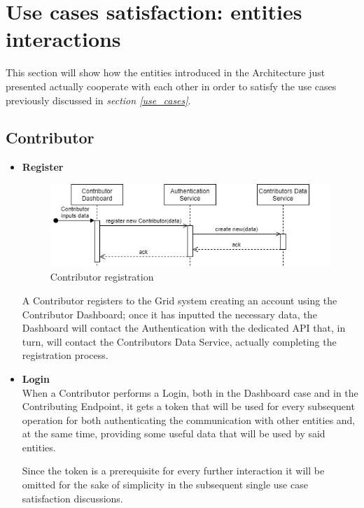 \section{Use cases satisfaction: entities interactions}\label{use_cases_satisfaction}
This section will show how the entities introduced in the Architecture just presented actually cooperate with each other in order to satisfy the use cases previously discussed in \textit{section \ref{use_cases}}. 

\subsection{Contributor}
\begin{itemize}
    \item \textbf{Register}\\
    \begin{figure}[!ht]
        \centering
        \includegraphics[scale=1]{document/chapters/chapter_5/images/use_cases_satisfaction_contributor_register.jpg}
        \caption{Contributor registration}
        \label{fig:use_cases_satisfaction_contributor_register}
    \end{figure}

    A Contributor registers to the Grid system creating an account using the Contributor Dashboard; once it has inputted the necessary data, the Dashboard will contact the Authentication with the dedicated API that, in turn, will contact the Contributors Data Service, actually completing the registration process.

    \item \textbf{Login}\\
    When a Contributor performs a Login, both in the Dashboard case and in the Contributing Endpoint, it gets a token that will be used for every subsequent operation for both authenticating the communication with other entities and, at the same time, providing some useful data that will be used by said entities.
    
    Since the token is a prerequisite for every further interaction it will be omitted for the sake of simplicity in the subsequent single use case satisfaction discussions. 
     

\end{itemize}

